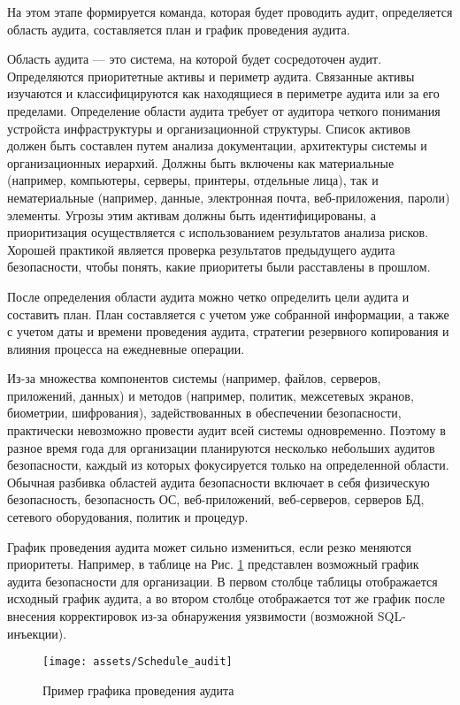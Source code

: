 На этом этапе формируется команда, которая будет проводить аудит, определяется область аудита, составляется план и график проведения аудита.

Область аудита — это система, на которой будет сосредоточен аудит. Определяются приоритетные активы и периметр аудита. Связанные активы изучаются и классифицируются как находящиеся в периметре аудита или за его пределами. Определение области аудита требует от аудитора четкого понимания устройста инфраструктуры и организационной структуры. Список активов должен быть составлен путем анализа документации, архитектуры системы и организационных иерархий. Должны быть включены как материальные (например, компьютеры, серверы, принтеры, отдельные лица), так и нематериальные (например, данные, электронная почта, веб-приложения, пароли) элементы. Угрозы этим активам должны быть идентифицированы, а приоритизация осуществляется с использованием результатов анализа рисков. Хорошей практикой является проверка результатов предыдущего аудита безопасности, чтобы понять, какие приоритеты были расставлены в прошлом.

После определения области аудита можно четко определить цели аудита и составить план. План составляется с учетом уже собранной информации, а также с учетом даты и времени проведения аудита, стратегии резервного копирования и влияния процесса на ежедневные операции.

Из-за множества компонентов системы (например, файлов, серверов, приложений, данных) и методов (например, политик, межсетевых экранов, биометрии, шифрования), задействованных в обеспечении безопасности, практически невозможно провести аудит всей системы одновременно. Поэтому в разное время года для организации планируются несколько небольших аудитов безопасности, каждый из которых фокусируется только на определенной области. Обычная разбивка областей аудита безопасности включает в себя физическую безопасность, безопасность ОС, веб-приложений, веб-серверов, серверов БД, сетевого оборудования, политик и процедур.

График проведения аудита может сильно измениться, если резко меняются приоритеты. Например, в таблице на Рис. \ref{fig:Schedule_audit} представлен возможный график аудита безопасности для организации. В первом столбце таблицы отображается исходный график аудита, а во втором столбце отображается тот же график после внесения корректировок из-за обнаружения уязвимости (возможной SQL-инъекции).

\begin{figure}[h!]
    \centering
    \texttt{[image: assets/Schedule\_audit]}
    \caption{Пример графика проведения аудита}
	\label{fig:Schedule_audit}
\end{figure}


